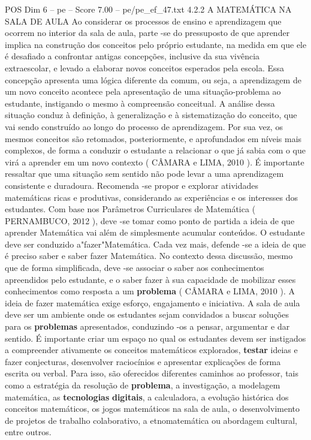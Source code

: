 \begin{textsample}{POS Dim 6 – pe – Score 7.00 – pe/pe\_ef\_47.txt}  \label{ex:f6_pos_253}
4.2.2 A MATEMÁTICA NA SALA DE AULA Ao considerar os processos de ensino e aprendizagem que ocorrem no interior da sala de aula, parte -se do pressuposto de que aprender implica na construção dos conceitos pelo próprio estudante, na medida em que ele é desafiado a confrontar antigas concepções, inclusive da sua vivência extraescolar, e levado a elaborar novos conceitos esperados pela escola.
Essa concepção apresenta uma lógica diferente da comum, ou seja, a aprendizagem de um novo conceito acontece pela apresentação de uma situação-problema ao estudante, instigando o mesmo à compreensão conceitual.
A análise dessa situação conduz à definição, à generalização e à sistematização do conceito, que vai sendo construído ao longo do processo de aprendizagem.
Por sua vez, os mesmos conceitos são retomados, posteriormente, e aprofundados em níveis mais complexos, de forma a conduzir o estudante a relacionar o que já sabia com o que virá a aprender em um novo contexto ( CÂMARA e LIMA, 2010 ).
É importante ressaltar que uma situação sem sentido não pode levar a uma aprendizagem consistente e duradoura.
Recomenda -se propor e explorar atividades matemáticas ricas e produtivas, considerando as experiências e os interesses dos estudantes.
Com base nos Parâmetros Curriculares de Matemática ( PERNAMBUCO, 2012 ), deve -se tomar como ponto de partida a ideia de que aprender Matemática vai além de simplesmente acumular conteúdos.
O estudante deve ser conduzido a"fazer"Matemática.
Cada vez mais, defende -se a ideia de que é preciso saber e saber fazer Matemática.
No contexto dessa discussão, mesmo que de forma simplificada, deve -se associar o saber aos conhecimentos apreendidos pelo estudante, e o saber fazer à sua capacidade de mobilizar esses conhecimentos como resposta a um \textbf{problema} ( CÂMARA e LIMA, 2010 ).
A ideia de fazer matemática exige esforço, engajamento e iniciativa.
A sala de aula deve ser um ambiente onde os estudantes sejam convidados a buscar soluções para os \textbf{problemas} apresentados, conduzindo -os a pensar, argumentar e dar sentido.
É importante criar um espaço no qual os estudantes devem ser instigados a compreender ativamente os conceitos matemáticos explorados, \textbf{testar} ideias e fazer conjecturas, desenvolver raciocínios e apresentar explicações de forma escrita ou verbal.
Para isso, são oferecidos diferentes caminhos ao professor, tais como a estratégia da resolução de \textbf{problema}, a investigação, a modelagem matemática, as \textbf{tecnologias} \textbf{digitais}, a calculadora, a evolução histórica dos conceitos matemáticos, os jogos matemáticos na sala de aula, o desenvolvimento de projetos de trabalho colaborativo, a etnomatemática ou abordagem cultural, entre outros.

\end{textsample}
